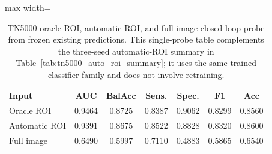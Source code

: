 \begin{table}[t]
    \centering
    \small
    \caption{TN5000 oracle ROI, automatic ROI, and full-image closed-loop probe from frozen existing predictions. This single-probe table complements the three-seed automatic-ROI summary in Table~\ref{tab:tn5000_auto_roi_summary}; it uses the same trained classifier family and does not involve retraining.}
    \label{tab:tn5000_oracle_auto_full_probe}
    \begin{adjustbox}{max width=\columnwidth}
    \begin{tabular}{lcccccc}
        \toprule
        Input & AUC & BalAcc & Sens. & Spec. & F1 & Acc \\
        \midrule
        Oracle ROI & 0.9464 & 0.8725 & 0.8387 & 0.9062 & 0.8299 & 0.8560 \\
        Automatic ROI & 0.9391 & 0.8675 & 0.8522 & 0.8828 & 0.8320 & 0.8600 \\
        Full image & 0.6490 & 0.5997 & 0.7110 & 0.4883 & 0.5865 & 0.6540 \\
        \bottomrule
    \end{tabular}
    \end{adjustbox}
\end{table}
